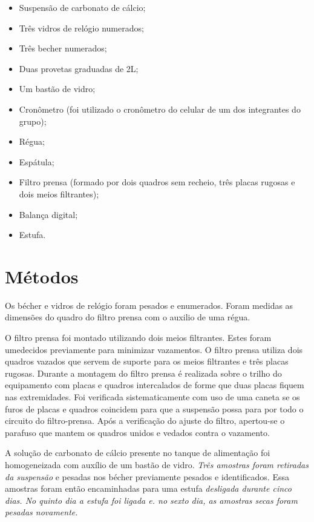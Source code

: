 \begin{itemize}

\item Suspensão de carbonato de cálcio;
\item Três vidros de relógio numerados;
\item Três becher numerados;
\item Duas provetas graduadas de 2L;
\item Um bastão de vidro;
\item Cronômetro (foi utilizado o cronômetro do celular de um dos integrantes do grupo);
\item Régua;
\item Espátula;
\item Filtro prensa (formado por dois quadros sem recheio, três placas rugosas e dois meios filtrantes);
\item Balança digital;
\item Estufa.


\end{itemize}

\section{Métodos}

Os bécher e vidros de relógio foram pesados e enumerados. Foram medidas as dimensões do quadro do filtro prensa com o auxilio de uma régua. 

O filtro prensa foi montado utilizando dois meios filtrantes. Estes foram umedecidos previamente para minimizar vazamentos. O filtro prensa utiliza dois quadros vazados que servem de suporte para os meios filtrantes e três placas rugosas. Durante a montagem do filtro prensa é realizada sobre o trilho do equipamento com placas e quadros intercalados de forme que duas placas fiquem nas extremidades. Foi verificada sistematicamente com uso de uma caneta se os furos de placas e quadros coincidem para que a suspensão possa para por todo o circuito do filtro-prensa. Após a verificação do ajuste do filtro, apertou-se o parafuso que mantem os quadros unidos e vedados contra o vazamento.

A solução de carbonato de cálcio presente no tanque de alimentação foi homogeneizada com auxílio de um bastão de vidro. \emph{Três amostras foram retiradas da suspensão} e pesadas nos bécher previamente pesados e identificados. Essa amostras foram então encaminhadas para uma estufa \emph{desligada durante cinco dias. No quinto dia a estufa foi ligada e. no sexto dia, as amostras secas foram pesadas novamente.}
 
